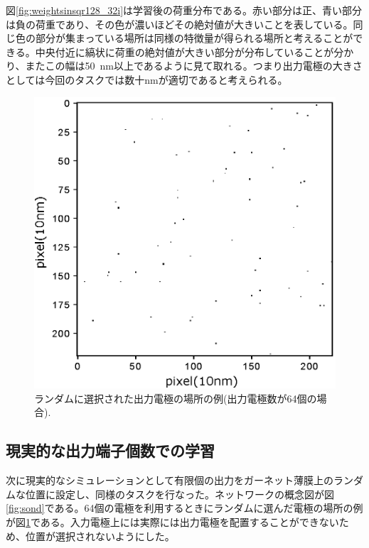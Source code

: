 \documentclass[a4j, twocolumn]{jsarticle}
\begin{document}
図\ref{fig:weightsinsqr128_32i}は学習後の荷重分布である。赤い部分は正、青い部分は負の荷重であり、その色が濃いほどその絶対値が大きいことを表している。同じ色の部分が集まっている場所は同様の特徴量が得られる場所と考えることができる。中央付近に縞状に荷重の絶対値が大きい部分が分布していることが分かり、またこの幅は50~nm以上であるように見て取れる。つまり出力電極の大きさとしては今回のタスクでは数十nmが適切であると考えられる。

\begin{figure}
\centering
\includegraphics[width=1\hsize]{./figures/pspsinsqr128_32i_l_hilsinsqr128_32i_l2_hil_num_neuron64_ramdomselected_timesequence_epoch2000_batchsize128_mask10_eta30_transition0_loopnum9_r} 
\caption{ランダムに選択された出力電極の場所の例(出力電極数が64個の場合).}
\label{fig:random}
\end{figure}

\subsection{現実的な出力端子個数での学習}
\label{subsec:limited}

次に現実的なシミュレーションとして有限個の出力をガーネット薄膜上のランダムな位置に設定し、同様のタスクを行なった。ネットワークの概念図が図\ref{fig:sond}である。64個の電極を利用するときにランダムに選んだ電極の場所の例が図\ref{fig:random}である。入力電極上には実際には出力電極を配置することができないため、位置が選択されないようにした。
\end{document}
